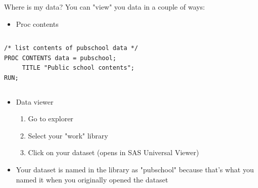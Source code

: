 \documentclass[table,smaller]{beamer}
\begin{document}
\begin{frame}[fragile,label=sec-2-4]{Where is my data?}
 You can "view" you data in a couple of ways:
\begin{itemize}
\item Proc contents
\end{itemize}
\vspace{-.75em} \begin{columns}  \begin{block}{}
\begin{verbatim}
/* list contents of pubschool data */
PROC CONTENTS data = pubschool;
     TITLE "Public school contents";
RUN;
\end{verbatim}
\end{block} \end{columns} \vspace{.25em}

\begin{itemize}
\item Data viewer
\begin{enumerate}
\item Go to explorer
\item Select your "work" library
\item Click on your dataset (opens in SAS Universal Viewer)
\end{enumerate}
\item Your dataset is named in the library as "pubschool" because that's what you named it when you originally opened the dataset
\end{itemize}
\end{frame}
\end{document}
